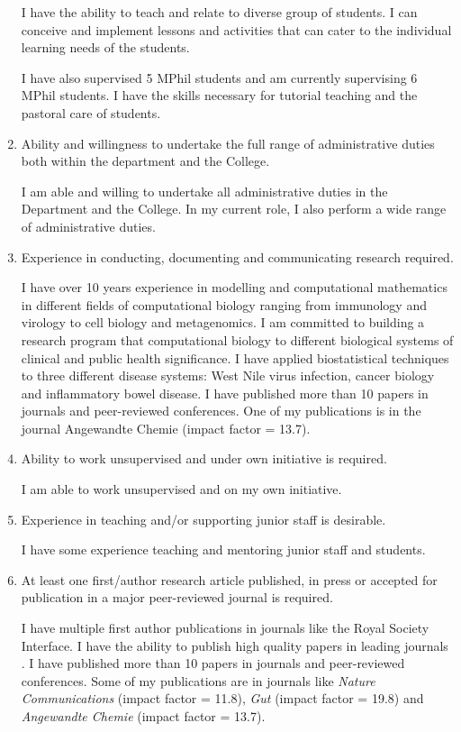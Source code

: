 \documentclass[10pt]{article}
\begin{document}
\begin{enumerate}
I have the ability to teach and relate to diverse group of students. I can conceive and implement lessons and activities that can cater to the individual learning needs of the students.

I have also supervised 5 MPhil students and am currently supervising 6 MPhil students. I have the skills necessary for tutorial teaching and the pastoral care of students.



\item Ability and willingness to undertake the full range of administrative duties both within the
department and the College.

I am able and willing to undertake all administrative duties in the Department and the College. In my current role, I also perform a wide range of administrative duties.


\item Experience in conducting, documenting and communicating research required.

I have over 10 years experience in modelling and computational mathematics in different fields of computational biology ranging from immunology and virology to cell biology and metagenomics. I am committed to building a research program that computational biology to different biological systems of clinical and public health significance.
 I have applied biostatistical techniques to three different disease systems: West Nile virus infection, cancer biology and inflammatory bowel disease. I have published more than 10 papers in journals and peer-reviewed conferences. One of my publications is in the journal Angewandte Chemie (impact factor = 13.7).


\item Ability to work unsupervised and under own initiative is required.

I am able to work unsupervised and on my own initiative.


\item Experience in teaching and/or supporting junior staff is desirable.

I have some experience teaching and mentoring junior staff and students.


\item At least one first/author research article published, in press or accepted for publication in a major peer-reviewed journal is required.


I have multiple first author publications in journals like the Royal Society Interface. I have the ability to publish high quality papers in leading journals \cite{Banerjee2018d,Banerjee2017g,Banerjee2016,Liu2014a,Mallick2019,Graessl2017,Banerjee2020d,Aschenbrenner2020}. I have published more than 10 papers in journals and peer-reviewed conferences. Some of my publications are in journals like \textit{Nature Communications} (impact factor = 11.8), \textit{Gut} (impact factor = 19.8) and \textit{Angewandte Chemie} (impact factor = 13.7). 



\end{enumerate}
\end{document}
